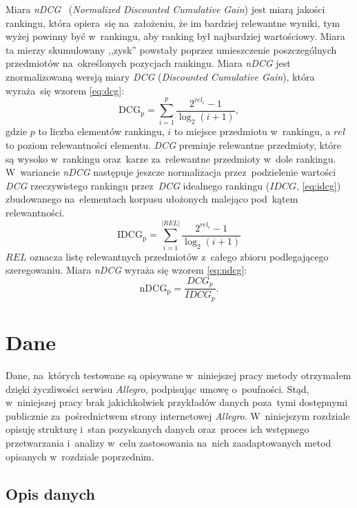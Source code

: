 \documentclass[pl]{minipw} %
\begin{document}
Miara \textit{nDCG}~\cite{ndcg} (\textit{Normalized Discounted Cumulative Gain}) jest miarą jakości rankingu, która opiera~się na~założeniu, że im bardziej relewantne wyniki, tym wyżej powinny być w~rankingu, aby ranking był najbardziej wartościowy. Miara ta mierzy skumulowany ,,zysk'' powstały poprzez umieszczenie poszczególnych przedmiotów na~określonych pozycjach rankingu. Miara \textit{nDCG} jest znormalizowaną wersją miary \textit{DCG} (\textit{Discounted Cumulative Gain}), która wyraża~się wzorem \ref{eq:dcg}: 
\begin{equation}
\label{eq:dcg}
{\mathrm  {DCG_{{p}}}}=\sum _{{i=1}}^{{p}}{\frac  {2^{{rel_{{i}}}}-1}{\log _{{2}}(i+1)}},
\end{equation}
gdzie $p$ to liczba elementów rankingu, $i$ to miejsce przedmiotu w~rankingu, a $rel$ to poziom relewantności elementu. \textit{DCG} premiuje relewantne przedmioty, które są wysoko w~rankingu oraz~karze za~relewantne przedmioty w~dole rankingu. W~wariancie \textit{nDCG} następuje jeszcze normalizacja przez~podzielenie wartości \textit{DCG} rzeczywistego rankingu przez~\textit{DCG} idealnego rankingu ($IDCG$, \ref{eq:idcg}) zbudowanego na~elementach korpusu ułożonych malejąco pod~kątem relewantności.
\begin{equation}
\label{eq:idcg}
\mathrm {IDCG_{p}} =\sum _{i=1}^{|REL|}{\frac {2^{rel_{i}}-1}{\log _{2}(i+1)}}
\end{equation}
$REL$ oznacza listę relewantnych przedmiotów z~całego zbioru podlegającego szeregowaniu. Miara \textit{nDCG} wyraża się wzorem \ref{eq:ndcg}:
\begin{equation}
\label{eq:ndcg}
{\mathrm  {nDCG_{{p}}}}={\frac  {DCG_{{p}}}{IDCG_{{p}}}}.
\end{equation}


\chapter{Dane}

Dane, na~których testowane są opisywane w~niniejszej pracy metody otrzymałem dzięki życzliwości serwisu \textit{Allegro}, podpisując umowę o~poufności. Stąd, w~niniejszej pracy brak jakichkolwiek przykładów danych poza~tymi dostępnymi publicznie za~pośrednictwem strony internetowej \textit{Allegro}. W~niniejszym rozdziale opisuję strukturę i~stan pozyskanych danych oraz~proces ich wstępnego przetwarzania i~analizy w~celu zastosowania na~nich zaadaptowanych metod opisanych w~rozdziale poprzednim. 

\section{Opis danych}
\end{document}
